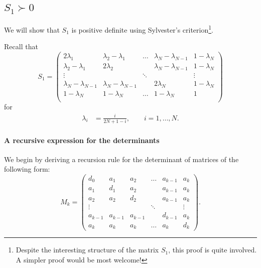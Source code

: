 \documentclass[12pt]{article}
\numberwithin{equation}{section}
\theoremstyle{definition}
\theoremstyle{remark}
\begin{document}
\subsection{$S_1 \succ 0$}

We will show that $S_1$ is positive definite using Sylvester's criterion\footnote{Despite
the interesting structure of the matrix $S_1$, this proof is quite involved. A simpler proof
would be most welcome!}.

Recall that
\[
    S_1=
    \begin{pmatrix}
        2 \lambda_1         & \lambda_2-\lambda_1           &\dots          &\lambda_N-\lambda_{N-1}    &1-\lambda_N  \\
        \lambda_2-\lambda_1         & 2 \lambda_2                   &          &\lambda_N-\lambda_{N-1}    &1-\lambda_N \\

        \vdots & & \ddots & &\vdots \\
        \lambda_N-\lambda_{N-1}     & \lambda_N-\lambda_{N-1}   &          & 2\lambda_N    & 1-\lambda_N  \\
        1-\lambda_N         & 1-\lambda_N       & \dots         & 1-\lambda_N   & 1 \\
    \end{pmatrix}
\]
for
\begin{align*}
    \lambda_i &= \frac{i}{2 N+1-i}, \qquad i=1,\dots,N.
\end{align*}


\paragraph{A recursive expression for the determinants}
We begin by deriving a recursion rule for the determinant of matrices of the following form:
\[
    M_k=
    \begin{pmatrix}
        d_0 &   a_1 &   a_2 &       \dots   &   a_{k-1} &   a_k \\
        a_1 &   d_1 &   a_2 &               &   a_{k-1} &   a_k \\
        a_2 &   a_2 &   d_2 &                   &   a_{k-1} &   a_k \\
        \vdots  &   &   &   \ddots  & & \vdots\\
        a_{k-1} &   a_{k-1} & a_{k-1}   &                   &   d_{k-1} &   a_k \\
        a_k &   a_k &   a_k &   \dots       &   a_k     &   d_k
    \end{pmatrix}.
\]
\end{document}

